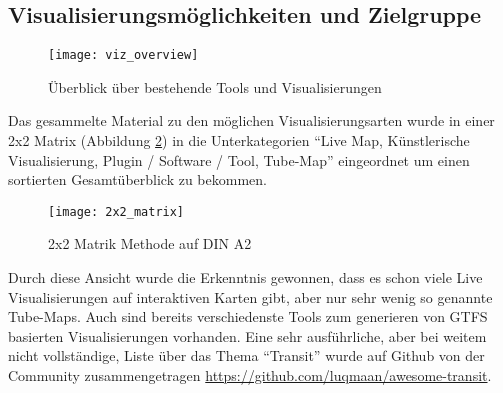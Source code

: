 \subsection{Visualisierungsmöglichkeiten und Zielgruppe}
\label{sub:visualisierungsmöglichkeiten_und_zielgruppe}
  \begin{figure}[ht]
    \begin{center}
      \texttt{[image: viz\_overview]}
      \caption{Überblick über bestehende Tools und Visualisierungen}
      \label{fig:viz_overview}
    \end{center}
  \end{figure}

  Das gesammelte Material zu den möglichen Visualisierungsarten wurde in einer 2x2 Matrix (Abbildung \ref{fig:2x2_matrix}) in die Unterkategorien "`Live Map, Künstlerische Visualisierung, Plugin / Software / Tool, Tube-Map"' eingeordnet um einen sortierten Gesamtüberblick zu bekommen. 

  \begin{figure}[htbp]
    \begin{center}
      \texttt{[image: 2x2\_matrix]}
      \caption{2x2 Matrik Methode auf DIN A2}
      \label{fig:2x2_matrix}
    \end{center}
  \end{figure}

  Durch diese Ansicht wurde die Erkenntnis gewonnen, dass es schon viele Live Visualisierungen auf interaktiven Karten gibt, aber nur sehr wenig so genannte Tube-Maps. Auch sind bereits verschiedenste Tools zum generieren von GTFS basierten Visualisierungen vorhanden. Eine sehr ausführliche, aber bei weitem nicht vollständige, Liste über das Thema "`Transit"' wurde auf Github von der Community zusammengetragen \url{https://github.com/luqmaan/awesome-transit}.


